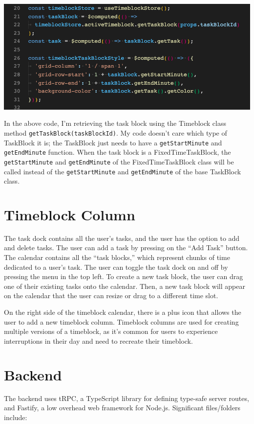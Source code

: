 \documentclass[notitlepage, 12pt]{report}
\newcommand{\code}[1]{\texttt{#1}}
\begin{document}
\includegraphics[width=1\textwidth]{polymorphism.png}

In the above code, I'm retrieving the task block using the Timeblock class method \code{getTaskBlock(taskBlockId)}. My code doesn't care which type of TaskBlock it is; the TaskBlock just needs to have a \code{getStartMinute} and \code{getEndMinute} function. When the task block is a FixedTimeTaskBlock, the \code{getStartMinute} and \code{getEndMinute} of the FixedTimeTaskBlock class will be called instead of the \code{getStartMinute} and \code{getEndMinute} of the base TaskBlock class.

\section*{Timeblock Column}


The task dock contains all the user's tasks, and the user has the option to add and delete tasks. The user can add a task by pressing on the ``Add Task'' button. The calendar contains all the ``task blocks,'' which represent chunks of time dedicated to a user's task. The user can toggle the task dock on and off by pressing the menu in the top left. To create a new task block, the user can drag one of their existing tasks onto the calendar. Then, a new task block will appear on the calendar that the user can resize or drag to a different time slot.

On the right side of the timeblock calendar, there is a plus icon that allows the user to add a new timeblock column. Timeblock columns are used for creating multiple versions of a timeblock, as it's common for users to experience interruptions in their day and need to recreate their timeblock.

\section*{Backend}
The backend uses tRPC, a TypeScript library for defining type-safe server routes, and Fastify, a low overhead web framework for Node.js. Significant files/folders include:
\end{document}
